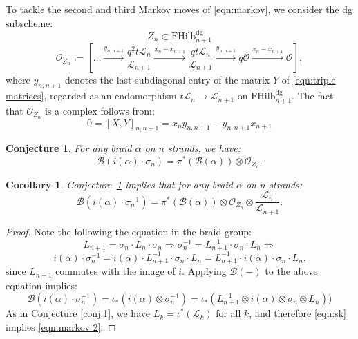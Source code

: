 \documentclass[12pt]{amsart}
\numberwithin{equation}{section}
\newtheorem{conjecture}[theorem]{Conjecture}
\newtheorem{corollary}[theorem]{Corollary}
\theoremstyle{definition}
\theoremstyle{remark}
\newcommand{\CB}{\mathcal{B}}
\newcommand{\CL}{\mathcal{L}}
\newcommand{\CO}{\mathcal{O}}
\newcommand{\CT}{\mathcal{T}}
\renewcommand{\1}{\mathbf{1}}
\newcommand{\FH}{\mathrm{FHilb}}
\newcommand{\dg}{\text{dg}}%
\begin{document}
To tackle the second and third Markov moves of \eqref{eqn:markov}, we consider the dg subscheme:
\begin{equation}
\label{eqn:def zn}
Z_n \subset \FH_{n+1}^\dg
\end{equation}
$$
\CO_{Z_n} := \left[\ldots \xrightarrow{y_{n,n+1}} \frac {q^2t\CL_n}{\CL_{n+1}} \xrightarrow{x_n-x_{n+1}} \frac {qt\CL_n}{\CL_{n+1}} \xrightarrow{y_{n,n+1}}  q\CO \xrightarrow{x_n-x_{n+1}} \CO \right],
$$
where $y_{n,n+1}$ denotes the last subdiagonal entry of the matrix $Y$ of \eqref{eqn:triple matrices}, regarded as an endomorphism $t\CL_n \rightarrow \CL_{n+1}$ on $\FH_{n+1}^{\dg}$. The fact that $\CO_{Z_n}$ is a complex follows from:
$$
0 = [X,Y]_{n,n+1} = x_n y_{n,n+1} - y_{n,n+1} x_{n+1}
$$ 

\begin{conjecture}
\label{conj:markov}
For any braid $\alpha$ on $n$ strands, we have: 
\begin{equation}
\label{eqn:markov 1}
\CB(i(\alpha) \cdot \sigma_n) = \pi^*(\CB(\alpha)) \otimes \CO_{Z_n} .
\end{equation}

\end{conjecture}

\begin{corollary}
\label{cor:markov 2}
Conjecture~\ref{conj:markov} implies that for any braid $\alpha$ on $n$ strands: 
\begin{equation}
\label{eqn:markov 2}
\CB(i(\alpha) \cdot \sigma^{-1}_n) = \pi^*(\CB(\alpha)) \otimes \CO_{Z_n} \otimes \frac {\CL_n}{\CL_{n+1}} .
\end{equation}

\end{corollary}

\begin{proof} Note the following the equation in the braid group:
$$
L_{n+1} = \sigma_n \cdot L_n \cdot \sigma_n \Rightarrow \sigma_{n}^{-1} = L_{n+1}^{-1} \cdot \sigma_n \cdot L_{n} \Rightarrow $$
$$
 i(\alpha) \cdot  \sigma_n^{-1} = i(\alpha) \cdot L_{n+1}^{-1}\cdot \sigma_n  \cdot L_{n} = L_{n+1}^{-1}\cdot i(\alpha) \cdot \sigma_n  \cdot L_{n}.
$$
since $L_{n+1}$ commutes with the image of $i$. Applying $\CB(-)$ to the above equation implies:
$$
\CB(i(\alpha)\cdot \sigma_n^{-1}) = \iota_*( i(\alpha)  \otimes  \sigma_n^{-1})  = \iota_*(L_{n+1}^{-1}\otimes i(\alpha)  \otimes \sigma_n  \otimes L_n))
$$
As in Conjecture \ref{conj:1}, we have $L_k = \iota^*(\CL_k)$ for all $k$, and therefore \eqref{eqn:sk} implies \eqref{eqn:markov 2}. 

\end{proof}
\end{document}
